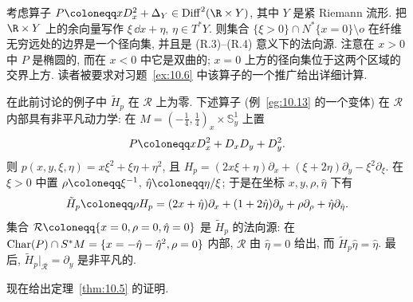 \begin{example}[Keldysh 算子]\label{eg:10.13}
考虑算子 $P \defeq x D_x^2 + \Delta_Y \in \Diff^2(\R \times Y)$, 其中 $Y$ 是紧 Riemann 流形. 把 $\R \times Y$ 上的余向量写作 $\xi\,\dd x + \eta$, $\eta \in T^* Y$. 则集合 $\{\xi > 0\} \cap N^*\{x = 0\} \setminus o$ 在纤维无穷远处的边界是一个径向集, 并且是 (R.3)--(R.4) 意义下的法向源. 注意在 $x > 0$ 中 $P$ 是椭圆的, 而在 $x < 0$ 中它是双曲的; $x = 0$ 上方的径向集位于这两个区域的交界上方. 读者被要求对习题~\ref{ex:10.6} 中该算子的一个推广给出详细计算.
\end{example}

\begin{example}\label{eg:10.14}
在此前讨论的例子中 $\tilde{H}_p$ 在 $\mathcal{R}$ 上为零. 下述算子 (例~\ref{eg:10.13} 的一个变体) 在 $\mathcal{R}$ 内部具有非平凡动力学: 在 $M = (-\frac{1}{4}, \frac{1}{4})_x \times \mathbb{S}^1_y$ 上置
\begin{equation}\label{eq:10.34}
    P \defeq x D_x^2 + D_x D_y + D_y^2.
\end{equation}
则 $p(x, y, \xi, \eta) = x\xi^2 + \xi\eta + \eta^2$, 且 $H_p = (2x\xi + \eta)\partial_x + (\xi + 2\eta)\partial_y - \xi^2 \partial_\xi$. 在 $\xi > 0$ 中置 $\rho \defeq \xi^{-1}$, $\hat{\eta} \defeq \eta/\xi$; 于是在坐标 $x, y, \rho, \hat{\eta}$ 下有
\begin{equation}\label{eq:10.35}
    \tilde{H}_p \defeq \rho H_p = (2x + \hat{\eta})\partial_x + (1 + 2\hat{\eta})\partial_y + \rho\partial_\rho + \hat{\eta}\partial_{\hat{\eta}}.
\end{equation}
集合 $\mathcal{R} \defeq \{x = 0, \rho = 0, \hat{\eta} = 0\}$ 是 $\tilde{H}_p$ 的法向源: 在 $\operatorname{Char}(P) \cap S^* M = \{x = -\hat{\eta} - \hat{\eta}^2, \rho = 0\}$ 内部, $\mathcal{R}$ 由 $\hat{\eta} = 0$ 给出, 而 $\tilde{H}_p \hat{\eta} = \hat{\eta}$. 最后, $\tilde{H}_p|_{\mathcal{R}} = \partial_y$ 是非平凡的.
\end{example}

现在给出定理~\ref{thm:10.5} 的证明.

